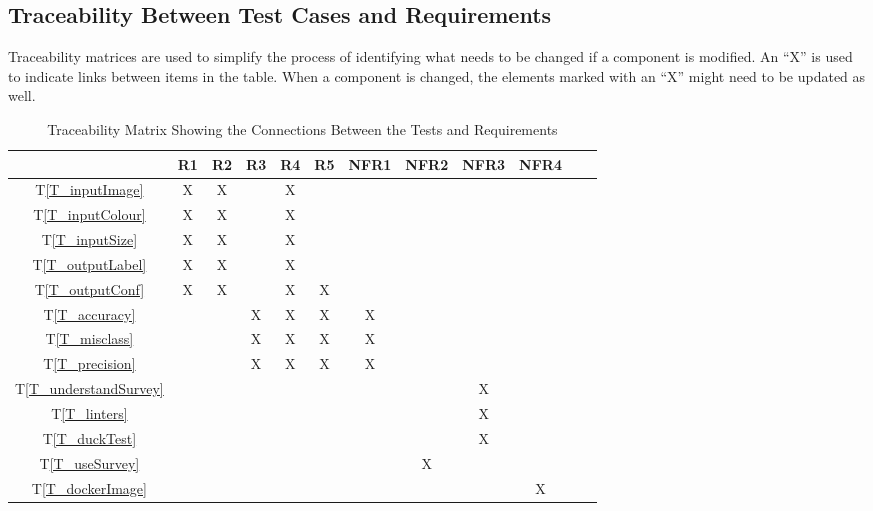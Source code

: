 \documentclass[12pt, titlepage]{article}
\newcommand{\tref}[1]{T\ref{#1}}
\begin{document}
\subsection{Traceability Between Test Cases and Requirements}

Traceability matrices are used to simplify the process of identifying what needs to be changed 
if a component is modified. An ``X'' is used to indicate links between items in the table. 
When a component is changed, the elements marked with an ``X'' might need to be updated as well.

\begin{table}[h!]
  \centering
  \begin{tabular}{|c|c|c|c|c|c|c|c|c|c|c|c|}
  \hline
    & R1
    & R2
    & R3
    & R4
    & R5
    & NFR1
    & NFR2
    & NFR3
    & NFR4
  \\ \hline
  \tref{T_inputImage}           &X&X& &X& & & & & \\ \hline
  \tref{T_inputColour}          &X&X& &X& & & & & \\ \hline
  \tref{T_inputSize}            &X&X& &X& & & & & \\ \hline
  \tref{T_outputLabel}          &X&X& &X& & & & & \\ \hline
  \tref{T_outputConf}           &X&X& &X&X& & & & \\ \hline
  \tref{T_accuracy}             & & &X&X&X&X& & & \\ \hline
  \tref{T_misclass}             & & &X&X&X&X& & & \\ \hline
  \tref{T_precision}            & & &X&X&X&X& & & \\ \hline
  \tref{T_understandSurvey}     & & & & & & & &X& \\ \hline
  \tref{T_linters}              & & & & & & & &X& \\ \hline
  \tref{T_duckTest}             & & & & & & & &X& \\ \hline
  \tref{T_useSurvey}            & & & & & & &X& & \\ \hline
  \tref{T_dockerImage}          & & & & & & & & &X\\ \hline
  \end{tabular}
  \caption{Traceability Matrix Showing the Connections Between the Tests and Requirements}
  \label{Table:A_trace}
\end{table}
\end{document}
